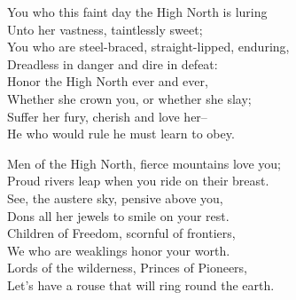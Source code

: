 \begin{poemblock}
You who this faint day the High North is luring\\
\idt Unto her vastness, taintlessly sweet;\\
You who are steel-braced, straight-lipped, enduring,\\
\idt Dreadless in danger and dire in defeat:\\
Honor the High North ever and ever,\\
\idt Whether she crown you, or whether she slay;\\
Suffer her fury, cherish and love her--\\
\idt He who would rule he must learn to obey.

Men of the High North, fierce mountains love you;\\
\idt Proud rivers leap when you ride on their breast.\\
See, the austere sky, pensive above you,\\
\idt Dons all her jewels to smile on your rest.\\
Children of Freedom, scornful of frontiers,\\
\idt We who are weaklings honor your worth.\\
Lords of the wilderness, Princes of Pioneers,\\
\idt Let's have a rouse that will ring round the earth.
\end{poemblock}

